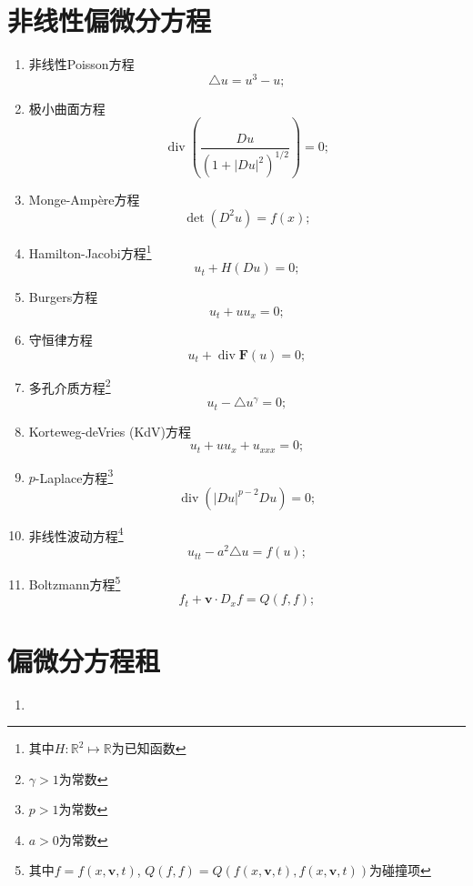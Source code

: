 \documentclass{ctexart}
\DeclareMathOperator{\diver}{div}
\newcommand{\RR}{\mathbb{R}}
\newcommand{\vecF}{{\bm F}}
\newcommand{\vecv}{\bm v}
\begin{document}
\section{非线性偏微分方程}
    \begin{enumerate}
        \item 非线性Poisson方程
            \[
            \triangle u = u^3 - u;
            \]
        \item 极小曲面方程
            \[
            \diver\left(\frac{Du}{(1+|Du|^2)^{1/2}}\right) = 0;
            \]
        \item Monge-Ampère方程
            \[
            \det(D^2u) = f(x);
            \]
        \item Hamilton-Jacobi方程\footnote{其中$H:\RR^2\mapsto\RR$为已知函数}
            \[
            u_t + H(Du) = 0;
            \]
        \item Burgers方程
            \[
            u_t + uu_x = 0;
            \]
        \item 守恒律方程
            \[
            u_t + \diver\vecF(u) = 0;
            \]
        \item 多孔介质方程\footnote{$\gamma>1$为常数}
            \[
            u_t - \triangle u^\gamma = 0;
            \]
        \item Korteweg-deVries (KdV)方程
            \[
            u_t + uu_x + u_{xxx} = 0;
            \]
        \item $p$-Laplace方程\footnote{$p>1$为常数}
            \[
            \diver\left(|Du|^{p-2}Du\right) = 0;
            \]
        \item 非线性波动方程\footnote{$a>0$为常数}
            \[
            u_{tt} - a^2\triangle u = f(u);
            \]
        \item Boltzmann方程\footnote{其中$f=f(x,\vecv,t)$, $Q(f,f)=Q(f(x,\vecv,t),f(x,\vecv,t))$为碰撞项}
            \[
            f_t + \vecv\cdot D_xf = Q(f,f);
            \]
    \end{enumerate}

\section{偏微分方程租}
    \begin{enumerate}
        \item 
    \end{enumerate}
\end{document}
